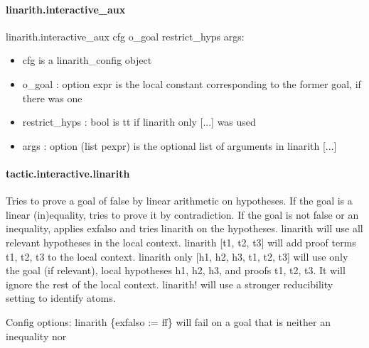 \documentclass{article}
\begin{document}
\paragraph{linarith.interactive\_aux}
\par
linarith.interactive\_aux cfg o\_goal restrict\_hyps args:
\begin{itemize}\item cfg is a linarith\_config object

\item o\_goal : option expr is the local constant corresponding to the former goal, if there was one

\item restrict\_hyps : bool is tt if 
\colorbox[RGB]{253,246,227}{{{{\color[RGB]{101, 123, 131} linarith only {[}...{]} }}}} was used

\item args : option (list pexpr) is the optional list of arguments in 
\colorbox[RGB]{253,246,227}{{{{\color[RGB]{101, 123, 131} linarith {[}...{]} }}}}
\end{itemize}\paragraph{tactic.interactive.linarith}
\par
Tries to prove a goal of 
\colorbox[RGB]{253,246,227}{{{{\color[RGB]{101, 123, 131} false }}}} by linear arithmetic on hypotheses.
If the goal is a linear (in)equality, tries to prove it by contradiction.
If the goal is not 
\colorbox[RGB]{253,246,227}{{{{\color[RGB]{101, 123, 131} false }}}} or an inequality, applies 
\colorbox[RGB]{253,246,227}{{{{\color[RGB]{101, 123, 131} exfalso }}}} and tries linarith on the
hypotheses.
\colorbox[RGB]{253,246,227}{{{{\color[RGB]{101, 123, 131} linarith }}}} will use all relevant hypotheses in the local context.
\colorbox[RGB]{253,246,227}{{{{\color[RGB]{101, 123, 131} linarith {[}t1, t2, t3{]} }}}} will add proof terms t1, t2, t3 to the local context.
\colorbox[RGB]{253,246,227}{{{{\color[RGB]{101, 123, 131} linarith only {[}h1, h2, h3, t1, t2, t3{]} }}}} will use only the goal (if relevant), local hypotheses
h1, h2, h3, and proofs t1, t2, t3. It will ignore the rest of the local context.
\colorbox[RGB]{253,246,227}{{{{\color[RGB]{101, 123, 131} linarith! }}}} will use a stronger reducibility setting to identify atoms.
\par
Config options:
\colorbox[RGB]{253,246,227}{{{{\color[RGB]{101, 123, 131} linarith \{exfalso  }}}{{{\color[RGB]{181, 137, 0} := }}}{{{\color[RGB]{101, 123, 131}  ff\} }}}} will fail on a goal that is neither an inequality nor 
\end{document}

